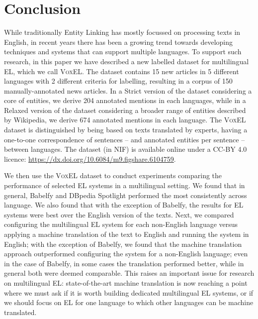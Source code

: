 \documentclass{llncs}
\begin{document}
\section{Conclusion}
\label{sec:conclusion}

While traditionally Entity Linking has mostly focussed on processing texts in English, in recent years there has been a growing trend towards developing techniques and systems that can support multiple languages. To support such research, in this paper we have described a new labelled dataset for multilingual EL, which we call \textsc{VoxEL}. The dataset contains 15 new articles in 5 different languages with 2 different criteria for labelling, resulting in a corpus of 150 manually-annotated news articles. In a Strict version of the dataset considering a core of entities, we derive 204 annotated mentions in each languages, while in a Relaxed version of the dataset considering a broader range of entities described by Wikipedia, we derive 674 annotated mentions in each language. The \textsc{VoxEL} dataset is distinguished by being based on texts translated by experts, having a one-to-one correspondence of sentences -- and annotated entities per sentence -- between languages. The dataset (in NIF) is available online under a CC-BY 4.0 licence: \url{https://dx.doi.org/10.6084/m9.figshare.6104759}.

We then use the \textsc{VoxEL} dataset to conduct experiments comparing the performance of selected EL systems in a multilingual setting. We found that in general, Babelfy and DBpedia Spotlight performed the most consistently across language. We also found that with the exception of Babelfy, the results for EL systems were best over the English version of the texts. Next, we compared configuring the multilingual EL system for each non-English language versus applying a machine translation of the text to English and running the system in English; with the exception of Babelfy, we found that the machine translation approach outperformed configuring the system for a non-English language; even in the case of Babelfy, in some cases the translation performed better, while in general both were deemed comparable. This raises an important issue for research on multilingual EL: state-of-the-art machine translation is now reaching a point where we must ask if it is worth building dedicated multilingual EL systems, or if we should focus on EL for one language to which other languages can be machine translated. 
\end{document}
